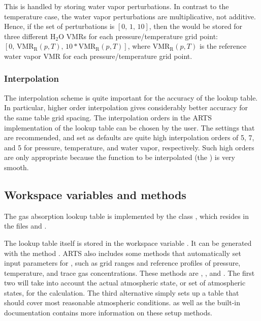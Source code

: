 This is handled by storing water vapor perturbations.  In contrast to
the temperature case, the water vapor perturbations are
multiplicative, not additive.  Hence, if the set of perturbations is
$[0,\, 1,\, 10]$, then the  would be stored for three
different H$_2$O VMRs for each pressure/temperature grid point: $[0,\,
\mathrm{VMR_R}(p,T),\, 10*\mathrm{VMR_R}(p,T)]$, where
$\mathrm{VMR_R}(p,T)$ is the reference water vapor VMR for each
pressure/temperature grid point.

\subsubsection{Interpolation}

The interpolation scheme is quite important for the accuracy of the
lookup table.  In particular, higher order interpolation gives
considerably better accuracy for the same table grid spacing.  The
interpolation orders in the ARTS implementation of the lookup table
can be chosen by the user.  The settings that are recommended, and set
as defaults are quite high
interpolation orders of 5, 7, and 5 for pressure, temperature, and
water vapor, respectively.  Such high orders are only appropriate
because the function to be interpolated (the ) is very smooth.

\subsection{Workspace variables and methods}

The gas absorption lookup table is implemented by the class
, which resides in the files
 and .

The lookup table itself is stored in the workspace variable
.  It can be generated with the method
.  ARTS also includes some methods that
automatically set input parameters for ,
such as grid ranges and reference profiles of pressure, temperature,
and trace gas concentrations.  These methods are
, , and
.  The first two will take into account
the actual atmospheric state, or set of atmospheric states, for the
calculation. The third alternative simply sets up a table that should
cover most reasonable atmospheric conditions.
\citet{buehler:absor:11} as well as the built-in documentation contains more
information on these setup methods.

